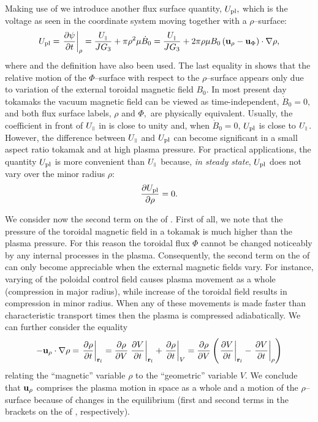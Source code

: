 Making use of  we introduce another flux surface quantity,
$U_{\rm pl},$ which is the voltage as seen in the coordinate system
moving together with a $\rho$--surface: 
\begin{equation}
\label{Upl}
U_{\rm pl}
=\left.\displaystyle{\partial \psi\over\partial t}\right|_\rho
=\frac{U_{\scriptscriptstyle\parallel}}{JG_3}
+\pi\rho^2 \mu\dot B_0
=\frac{U_{\scriptscriptstyle\parallel}}{JG_3}
+2\pi\rho\mu B_0\left({\bf u}_\rho-{\bf u}_\Phi\right)\cdot\nabla\rho
,\end{equation}
where  and the definition  have also been used. 
The last equality in  shows that the relative motion of the
$\Phi$--surface with respect to the $\rho$--surface appears only due to
variation of the external toroidal magnetic field $B_0$. 
In most present day tokamaks the vacuum magnetic field can be viewed as
time-independent, $\dot B_0=0,$ and both flux surface labels,
$\rho$ and $\Phi,$ are physically equivalent. 
Usually, the coefficient in front of $U_{\scriptscriptstyle\parallel}$ in  is close to
unity and, when $\dot B_0=0$, $U_{\rm pl}$ is close to $U_{\scriptscriptstyle\parallel}$. 
However, the difference between $U_{\scriptscriptstyle\parallel}$ and $U_{\rm pl}$ can become
significant in a small aspect ratio tokamak and at high plasma pressure. 
For practical applications, the quantity $U_{\rm pl}$ is more convenient
than $U_{\scriptscriptstyle\parallel}$ because, {\em in steady state}, 
$U_{\rm pl}$ does not vary over the minor radius $\rho:$ 
\begin{equation}
\label{Uplss}
\displaystyle{\partial U_{\rm pl}\over\partial \rho}=0
.\end{equation}

We consider now the second term on the \rhs  of . 
First of all, we note that the pressure of the toroidal magnetic field
in a tokamak is much higher than the plasma pressure. 
For this reason the toroidal flux $\Phi$ cannot be changed noticeably
by any internal processes in the plasma. 
Consequently, the second term on the \rhs  of  can
only become appreciable when the external magnetic fields vary. 
For instance, varying of the poloidal control field causes
plasma movement as a whole (compression in major radius), while increase
of the toroidal field results in compression in minor radius.
When any of these movements is made faster than characteristic transport
times then the plasma is compressed adiabatically.
We can further consider the equality 
\begin{equation}
\label{drho}
-{\bf u}_\rho\cdot\nabla\rho
=\left.\displaystyle{\partial \rho\over\partial t}\right|_{{\bf r}_l}
=\displaystyle{\partial \rho\over\partial V}\left.\displaystyle{\partial V\over\partial t}\right|_{{\bf r}_l}
+\left.\displaystyle{\partial \rho\over\partial t}\right|_V
=\displaystyle{\partial \rho\over\partial V}\left(\left.\displaystyle{\partial V\over\partial t}\right|_{{\bf r}_l}
-\left.\displaystyle{\partial V\over\partial t}\right|_\rho\right)
\end{equation}
relating the ``magnetic'' variable $\rho$ to the ``geometric'' variable
$V$. We conclude that ${\bf u}_\rho$ comprises the plasma motion in
space as a whole and a motion of the $\rho$--surface because of changes
in the equilibrium (first and second
terms in the brackets on the \rhs of , respectively).  


